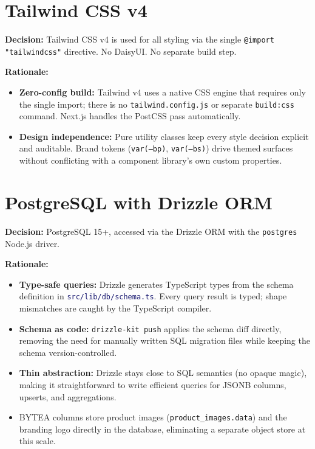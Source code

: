 \documentclass[12pt,a4paper,twoside]{report}
\newcommand{\code}[1]{\texttt{#1}}
\newcommand{\file}[1]{\texttt{\textcolor{MidnightBlue}{#1}}}
\begin{document}
\section{Tailwind CSS v4}

\textbf{Decision:} Tailwind CSS v4 is used for all styling via the
single \code{@import "tailwindcss"} directive. No DaisyUI. No
separate build step.

\textbf{Rationale:}
\begin{itemize}
  \item \textbf{Zero-config build:} Tailwind v4 uses a native CSS
        engine that requires only the single import; there is no
        \code{tailwind.config.js} or separate \code{build:css} command.
        Next.js handles the PostCSS pass automatically.
  \item \textbf{Design independence:} Pure utility classes keep every
        style decision explicit and auditable. Brand tokens
        (\code{var(--bp)}, \code{var(--bs)}) drive themed surfaces
        without conflicting with a component library's own custom
        properties.
\end{itemize}

\section{PostgreSQL with Drizzle ORM}

\textbf{Decision:} PostgreSQL 15+, accessed via the Drizzle ORM with
the \code{postgres} Node.js driver.

\textbf{Rationale:}
\begin{itemize}
  \item \textbf{Type-safe queries:} Drizzle generates TypeScript types
        from the schema definition in \file{src/lib/db/schema.ts}.
        Every query result is typed; shape mismatches are caught by the
        TypeScript compiler.
  \item \textbf{Schema as code:} \code{drizzle-kit push} applies the
        schema diff directly, removing the need for manually written SQL
        migration files while keeping the schema version-controlled.
  \item \textbf{Thin abstraction:} Drizzle stays close to SQL semantics
        (no opaque magic), making it straightforward to write efficient
        queries for JSONB columns, upserts, and aggregations.
  \item BYTEA columns store product images (\code{product\_images.data}) and the branding logo
        directly in the database, eliminating a separate object store at
        this scale.
\end{itemize}
\end{document}
